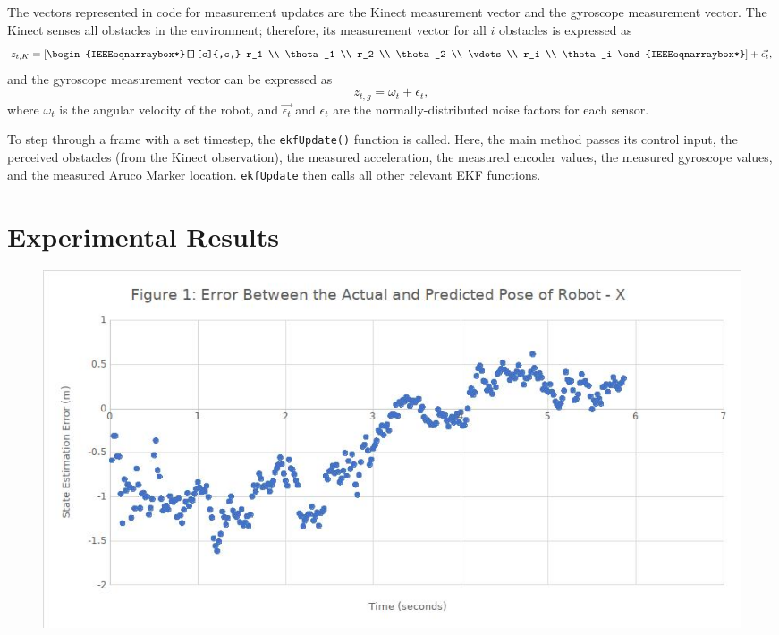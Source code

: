 \documentclass[journal]{IEEEtran}
\begin{document}
 The vectors represented
in code for measurement updates are the Kinect measurement vector and the gyroscope measurement vector.
The Kinect senses all obstacles in the environment; therefore, its measurement vector for all $i$ obstacles 
is expressed as
\begin{equation*}
 z_{t,K} = \left[\begin{IEEEeqnarraybox*}[][c]{,c,}
           r_1 \\
           \theta_1 \\
           r_2 \\
           \theta_2 \\
           \vdots \\
           r_i \\
           \theta_i
           \end{IEEEeqnarraybox*}\right] + \vec{\epsilon_t},
\end{equation*}
and the gyroscope measurement vector can be expressed as 
\begin{equation*}
 z_{t,g} = \omega_t + \epsilon_t,
\end{equation*}
where $\omega_t$ is the angular velocity of the robot, and $\vec{\epsilon_t}$ and $\epsilon_t$ are the 
normally-distributed noise factors for each sensor.

To step through a frame with a set timestep, the \texttt{ekfUpdate()} function is called. Here, the main 
method passes its control input, the perceived obstacles (from the Kinect observation), the measured 
acceleration, the measured encoder values, the measured gyroscope values, and the measured Aruco 
Marker location. \texttt{ekfUpdate} then calls all other relevant EKF functions. 



\section{Experimental Results}



\begin{figure}[!t]%
\centering
\includegraphics[width=0.9\linewidth]{Figures/1-actual-predicted-error-x.jpg}
\caption{}
\label{fig:1}
\end{figure}
\end{document}
